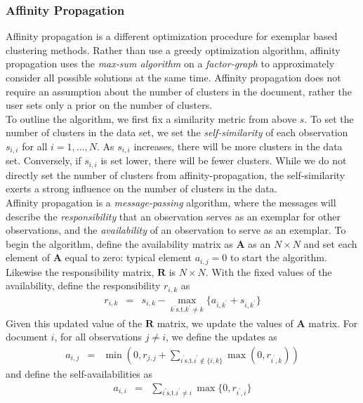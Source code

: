 \documentclass[11pt,letterpaper]{article}
\numberwithin{equation}{section}
\begin{document}
\subsubsection{Affinity Propagation}
Affinity propagation is a different optimization procedure for
exemplar based clustering methods.  Rather than use a greedy
optimization algorithm, affinity propagation uses the \emph{max-sum
algorithm} on a \emph{factor-graph} to approximately consider all
possible solutions at the same time.  Affinity propagation does not
require an assumption about the number of clusters in the document,
rather the user sets only a prior on the number of clusters.  \\
\indent To outline the algorithm, we first fix a similarity metric
from above $s$.  To set the number of clusters in the data set, we
set the \emph{self-similarity} of each observation $s_{i,i}$ for all
$i=1,\hdots, N$.  As $s_{i,i}$ increases, there will be more
clusters in the data set.  Conversely, if $s_{i,i}$ is set lower,
there will be fewer clusters.  While we do not directly set the number of clusters from affinity-propagation, the self-similarity
exerts a strong influence on the number of clusters in the data.  \\
\indent Affinity propagation is a \emph{message-passing} algorithm,
where the messages will describe the \emph{responsibility} that an
observation serves as an exemplar for other observations, and the
\emph{availability} of an observation to serve as an exemplar.  To
begin the algorithm, define the availability matrix as
$\boldsymbol{A}$ as an $N \times N$ and set each element of
$\boldsymbol{A}$ equal to zero: typical element $a_{i,j} = 0$ to
start the algorithm.  Likewise the responsibility matrix,
$\boldsymbol{R}$ is $N \times N$.  With the fixed values of the
availability, define the responsibility $r_{i,k} $ as
\begin{eqnarray}
r_{i,k} & = & s_{i,k} - \max_{k^{'} \text{s.t.} k^{'} \neq k } \{
a_{i,k^{'}} + s_{i,k^{'}} \} \nonumber
\end{eqnarray}
Given this updated value of the $\boldsymbol{R}$ matrix, we update
the values of $\boldsymbol{A}$ matrix.  For document $i$, for all
observations $j \neq i$, we define the updates as
\begin{eqnarray}
a_{i,j} & = & \min\left(0, r_{j,j} + \sum_{i^{'} \text{s.t.} i^{'}
\notin \{i, k\}} \max \left(0, r_{i^{'}, k} \right) \right)
\nonumber
\end{eqnarray}
and define the self-availabilities as
\begin{eqnarray}
a_{i,i} & = & \sum_{i^{'} \text{s.t.} i^{'} \neq i } \max\{0,
r_{i^{'},i} \}  \nonumber
\end{eqnarray}
\end{document}
